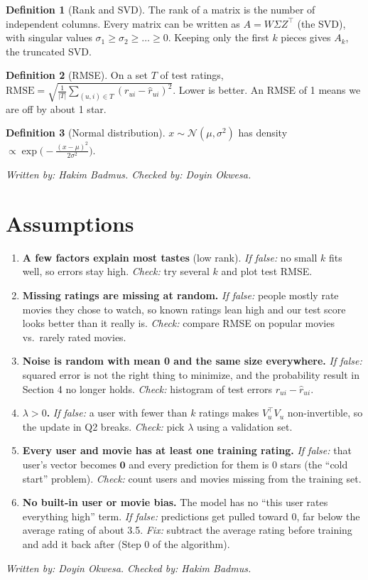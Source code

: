 \documentclass[11pt]{article}
\theoremstyle{definition}
\newtheorem{definition}{Definition}
\newcommand{\checked}[2]{\par\smallskip\noindent\textit{Written by: #1. \quad Checked by: #2.}\par}
\begin{document}
\begin{definition}[Rank and SVD]
The rank of a matrix is the number of independent columns. Every matrix can be written as $A=W\Sigma Z^\top$ (the SVD), with singular values $\sigma_1\ge\sigma_2\ge\dots\ge0$. Keeping only the first $k$ pieces gives $A_k$, the truncated SVD.
\end{definition}

\begin{definition}[RMSE]
On a set $T$ of test ratings, $\text{RMSE}=\sqrt{\frac{1}{|T|}\sum_{(u,i)\in T}(r_{ui}-\hat r_{ui})^2}$. Lower is better. An RMSE of 1 means we are off by about 1 star.
\end{definition}

\begin{definition}[Normal distribution]
$x\sim\mathcal N(\mu,\sigma^2)$ has density $\propto\exp\!\big(-\frac{(x-\mu)^2}{2\sigma^2}\big)$.
\end{definition}
\checked{Hakim Badmus}{Doyin Okwesa}

\section{Assumptions}
\begin{enumerate}[label=\textbf{A\arabic*.}, leftmargin=*]
\item \textbf{A few factors explain most tastes} (low rank).
\emph{If false:} no small $k$ fits well, so errors stay high.
\emph{Check:} try several $k$ and plot test RMSE.

\item \textbf{Missing ratings are missing at random.}
\emph{If false:} people mostly rate movies they chose to watch, so known ratings lean high and our test score looks better than it really is.
\emph{Check:} compare RMSE on popular movies vs.\ rarely rated movies.

\item \textbf{Noise is random with mean 0 and the same size everywhere.}
\emph{If false:} squared error is not the right thing to minimize, and the probability result in Section 4 no longer holds.
\emph{Check:} histogram of test errors $r_{ui}-\hat r_{ui}$.

\item \textbf{$\lambda>0$.}
\emph{If false:} a user with fewer than $k$ ratings makes $V_u^\top V_u$ non-invertible, so the update in Q2 breaks.
\emph{Check:} pick $\lambda$ using a validation set.

\item \textbf{Every user and movie has at least one training rating.}
\emph{If false:} that user's vector becomes $\mathbf 0$ and every prediction for them is 0 stars (the ``cold start'' problem).
\emph{Check:} count users and movies missing from the training set.

\item \textbf{No built-in user or movie bias.} The model has no ``this user rates everything high'' term.
\emph{If false:} predictions get pulled toward 0, far below the average rating of about 3.5.
\emph{Fix:} subtract the average rating before training and add it back after (Step 0 of the algorithm).
\end{enumerate}
\checked{Doyin Okwesa}{Hakim Badmus}
\end{document}
